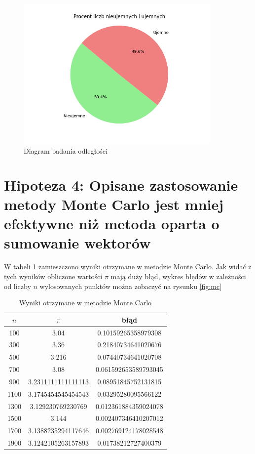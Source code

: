 \documentclass[12pt,a4paper]{article}
\begin{document}
\begin{figure}[!htb]
    \centering
        \centering
        \includegraphics[width=10cm]{images/h3.png}
        \caption{Diagram badania odległości}
        \label{fig:h3}
\end{figure}

\newpage

\section{Hipoteza 4: Opisane zastosowanie metody Monte Carlo jest mniej efektywne niż metoda oparta o sumowanie wektorów}

W tabeli \ref{tab:h4} zamieszczono wyniki otrzymane w metodzie Monte Carlo. Jak widać z tych wyników obliczone wartości $\pi$ mają duży błąd, wykres błędów w zależności od liczby $n$ wylosowanych punktów można zobaczyć na rysunku \ref{fig:mc}

\begin{table}[htbp]
    \centering
    \begin{tabular}{| c | c | c |}
    \hline
    {$n$} & {$\pi$} & {błąd}  \\
    \hline
       100  & 3.04 & 0.10159265358979308 \\
       300  & 3.36 & 0.21840734641020676 \\
       500  & 3.216 & 0.07440734641020708 \\
       700  & 3.08 & 0.061592653589793045 \\
       900  & 3.2311111111111113 & 0.08951845752131815 \\
       1100 &  3.1745454545454543 & 0.03295280095566122 \\
       1300 &  3.129230769230769 & 0.012361884359024078 \\
       1500 &  3.144 & 0.002407346410207012 \\
       1700 &  3.1388235294117646 & 0.002769124178028548 \\
       1900 &  3.1242105263157893 & 0.01738212727400379 \\
    \hline
    \end{tabular}
    \caption{Wyniki otrzymane w metodzie Monte Carlo}
    \label{tab:h4}
\end{table}
\end{document}
